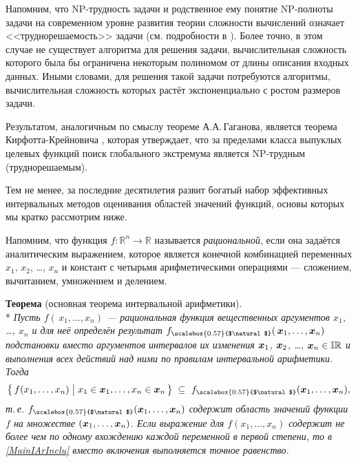 \documentclass[a5paper,openany]{book}
\newcommand{\mbf}[1]{\protect\text{\boldmath$#1$}}
\newcommand{\mbb}{\mathbb}
\newcommand{\NExt}{_{\scalebox{0.57}{$\natural$}}}
\begin{document}
\bigskip 
Напомним, что NP-трудность задачи и родственное ему понятие NP-полноты задачи 
на современном уровне развития теории сложности вычислений означает <<труднорешаемость>>  
задачи (см. подробности в \cite{GareyJohnson}). Более точно, в этом случае не существует 
алгоритма для решения задачи, вычислительная сложность которого была бы ограничена 
некоторым полиномом от длины описания входных данных. Иными словами, для решения такой 
задачи потребуются алгоритмы, вычислительная сложность которых растёт экспоненциально 
с ростом размеров задачи.     
   
Результатом, аналогичным по смыслу теореме А.А.\,Гаганова, является теорема 
Кирфотта-Крейновича \cite{KearfottKreinovich}, которая утверждает, что за пределами 
класса выпуклых целевых функций поиск глобального экстремума является NP-трудным 
(труднорешаемым).  
   
Тем не менее, за последние десятилетия развит богатый набор эффективных интервальных 
методов оценивания областей значений функций, основы которых мы кратко рассмотрим 
ниже. 
  
Напомним, что функция $f:\mbb{R}^{n}\to\mbb{R}$ называется \emph{рациональной}, если 
она задаётся аналитическим выражением, которое является конечной комбинацией переменных 
$x_1$, $x_2$, \ldots, $x_n$ и констант с четырьмя арифметическими операциями ---  
сложением, вычитанием, умножением и делением. 
    
  
\addvspace{\bigskipamount}\noindent
\textbf{Теорема} {\rm(основная теорема интервальной арифметики).}
\\*%
{\sl Пусть $f(\,x_{1}, \ldots, x_{n})$ --- рациональная функция вещественных 
аргументов $x_{1}$, \ldots, $x_{n}$ и для неё определён результат  $f\NExt 
(\,\mbf{x}_{1}, \ldots, \mbf{x}_{n})$ подстановки вместо аргументов интервалов их 
изменения $\mbf{x}_{1}$, $\mbf{x}_{2}$, \ldots, $\mbf{x}_{n}\in\mbb{IR}$ и выполнения 
всех действий над ними по правилам интервальной арифметики. Тогда 
\begin{equation}
\label{MainIArInclu}
\bigl\{\, f( x_{1}, \ldots, x_{n}) \bigm| x_{1}\in\mbf{x}_{1}, 
   \ldots, x_{n}\in\mbf{x}_{n}\,\bigr\} \;\subseteq \  
   f\NExt(\mbf{x}_{1}, \ldots, \mbf{x}_{n}),
\end{equation}
т.\,е. $f\NExt(\mbf{x}_{1}, \ldots, \mbf{x}_{n})$ содержит область значений 
функции $f$ на множестве $(\mbf{x}_{1}, \ldots, \mbf{x}_{n})$. Если выражение 
для $f(x_{1}, \ldots, x_{n})$ содержит не более чем по одному вхождению каждой 
переменной в первой степени, то в \eqref{MainIArInclu} вместо включения выполняется 
точное равенство.} 
  
\end{document}
